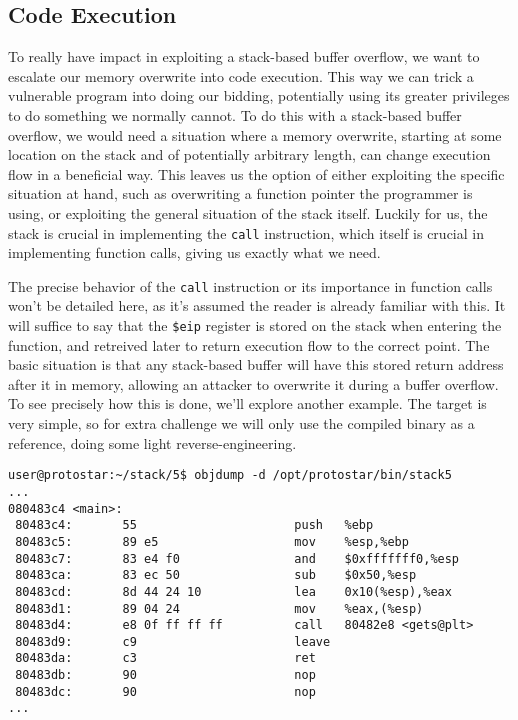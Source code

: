 \subsection{Code Execution}

To really have impact in exploiting a stack-based buffer overflow, we want to escalate our
memory overwrite into code execution. This way we can trick a vulnerable program into
doing our bidding, potentially using its greater privileges to do something we normally cannot.
To do this with a stack-based buffer overflow, we would need a situation where a memory overwrite, 
starting at some location on the stack and of potentially arbitrary length, can change execution
flow in a beneficial way. This leaves us the option of either exploiting the specific situation
at hand, such as overwriting a function pointer the programmer is using, or exploiting the general
situation of the stack itself. Luckily for us, the stack is crucial in implementing the \texttt{call}
instruction, which itself is crucial in implementing function calls, giving us exactly what we need.

The precise behavior of the \texttt{call} instruction or its importance in function calls won't be detailed
here, as it's assumed the reader is already familiar with this. It will suffice to say that the \texttt{\$eip}
register is stored on the stack when entering the function, and retreived later to return execution
flow to the correct point. The basic situation is that any stack-based buffer will have this stored return
address after it in memory, allowing an attacker to overwrite it during a buffer overflow. To see precisely
how this is done, we'll explore another example. The target is very simple, so for extra challenge
we will only use the compiled binary as a reference, doing some light reverse-engineering.

\begin{lstlisting}
user@protostar:~/stack/5$ objdump -d /opt/protostar/bin/stack5
...
080483c4 <main>:
 80483c4:       55                      push   %ebp
 80483c5:       89 e5                   mov    %esp,%ebp
 80483c7:       83 e4 f0                and    $0xfffffff0,%esp
 80483ca:       83 ec 50                sub    $0x50,%esp
 80483cd:       8d 44 24 10             lea    0x10(%esp),%eax
 80483d1:       89 04 24                mov    %eax,(%esp)
 80483d4:       e8 0f ff ff ff          call   80482e8 <gets@plt>
 80483d9:       c9                      leave  
 80483da:       c3                      ret    
 80483db:       90                      nop
 80483dc:       90                      nop
...
\end{lstlisting}

